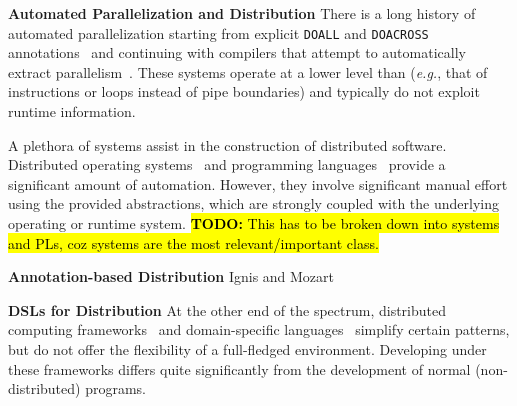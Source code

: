 \documentclass[sigplan,10pt,review,anonymous]{acmart}
\newcommand{\eg}{{\em e.g.}, }
\newcommand{\heading}[1]{\vspace{4pt}\noindent\textbf{#1}\enspace}
\newcommand{\ttt}[1]{\texttt{\small #1}}
\newcommand{\TODO}[1]{\hl{\textbf{TODO:} #1}\xspace}
\begin{document}
\heading{Automated Parallelization and Distribution}
There is a long history of automated parallelization starting from explicit \ttt{DOALL} and \ttt{DOACROSS} annotations~\cite{par1, par2} and continuing with compilers that attempt to automatically extract parallelism~\cite{padua1993polaris,hall1996maximizing}.
These systems operate at a lower level than \sys (\eg that of instructions or loops instead of pipe boundaries) and typically do not exploit runtime information.

A plethora of systems assist in the construction of distributed software.
Distributed operating systems~\cite{rashid1981accent, walker1983locus, ousterhout1988sprite, mullender1990amoeba, pike1990plan9, rozier1991overview, dorward1997inferno, barak1998mosix, schwarzkopf2013dios, sacha2013osprey} and programming languages~\cite{erlang:96, acute:05, mace:07, cloudhaskell:11}
provide a significant amount of automation. %
However, they involve significant manual effort using the provided abstractions, which are strongly coupled with the underlying operating or runtime system.
\TODO{This has to be broken down into systems and PLs, coz systems are the most relevant/important class.}

\heading{Annotation-based Distribution}
Ignis and Mozart

\heading{DSLs for Distribution}
At the other end of the spectrum, distributed computing frameworks~\cite{mapreduce:08, ciel:11, spark:12, naiad:13, jetstream:14} and domain-specific languages~\cite{alvaro2011consistency, distal:13, meiklejohn2015lasp, psync:16, dartagnan:18}
simplify certain patterns, 
but do not offer the flexibility of a full-fledged environment.
Developing under these frameworks differs quite significantly from the development of normal (non-distributed) programs.
\end{document}
